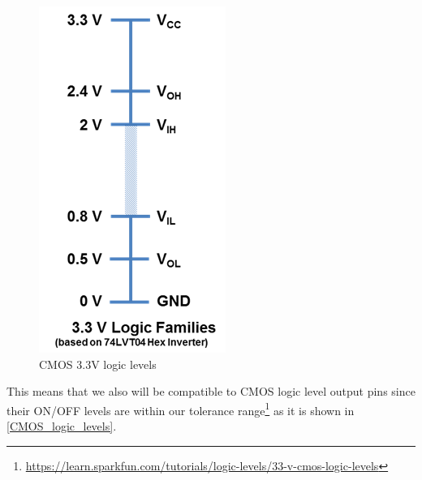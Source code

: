 \begin{figure}[H]
	\centering
	\includegraphics[scale=0.5]{cmos_3v3.png}
	\caption{CMOS 3.3V logic levels}
	\label{CMOS_logic_levels}
\end{figure}

This means that we also will be compatible to CMOS logic level output pins since their ON/OFF levels are within our tolerance range\footnote{\url{https://learn.sparkfun.com/tutorials/logic-levels/33-v-cmos-logic-levels}} as it is shown in \autoref{CMOS_logic_levels}.